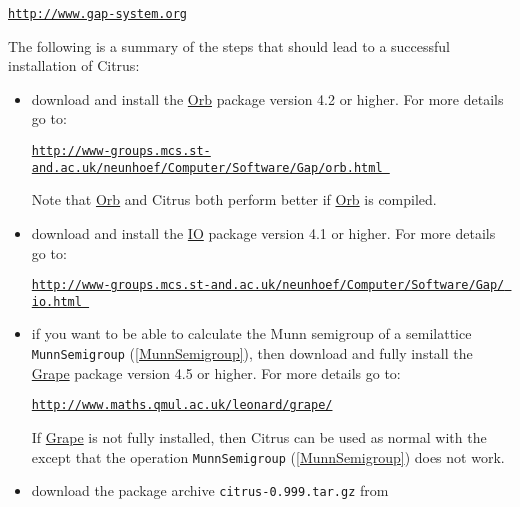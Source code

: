 \documentclass[a4paper,11pt]{report}
\begin{document}
{{\noindent\vspace{\baselineskip} \href{http://www.gap-system.org} {\texttt{http://www.gap-system.org}}

 \noindent The following is a summary of the steps that should lead to a successful
installation of \textsf{Citrus}: 
\begin{itemize}
\item  download and install the \href{ http://www-groups.mcs.st-and.ac.uk/~neunhoef/Computer/Software/Gap/orb.html } {Orb} package version 4.2 or higher. For more details go to: \vspace{\baselineskip}

\noindent \href{http://www-groups.mcs.st-and.ac.uk/~neunhoef/Computer/Software/Gap/orb.html } {\texttt{http://www-groups.mcs.st-and.ac.uk/\texttt{}neunhoef/Computer/Software/Gap/orb.html }}

 \noindent Note that \href{ http://www-groups.mcs.st-and.ac.uk/~neunhoef/Computer/Software/Gap/orb.html } {Orb} and \textsf{Citrus} both perform better if \href{ http://www-groups.mcs.st-and.ac.uk/~neunhoef/Computer/Software/Gap/orb.html } {Orb} is compiled. 
\item  download and install the \href{ http://www-groups.mcs.st-and.ac.uk/~neunhoef/Computer/Software/Gap/io.html } {IO} package version 4.1 or higher. For more details go to: \vspace{\baselineskip}

\noindent \href{http://www-groups.mcs.st-and.ac.uk/~neunhoef/Computer/Software/Gap/ io.html } {\texttt{http://www-groups.mcs.st-and.ac.uk/\texttt{}neunhoef/Computer/Software/Gap/ io.html }} 
\item  if you want to be able to calculate the Munn semigroup of a semilattice \texttt{MunnSemigroup} (\ref{MunnSemigroup}), then download and fully install the \href{http://www.maths.qmul.ac.uk/~leonard/grape/} {Grape} package version 4.5 or higher. For more details go to:\vspace{\baselineskip}

\noindent \href{http://www.maths.qmul.ac.uk/~leonard/grape/} {\texttt{http://www.maths.qmul.ac.uk/\texttt{}leonard/grape/}}

 If \href{http://www.maths.qmul.ac.uk/~leonard/grape/} {Grape} is not fully installed, then \textsf{Citrus} can be used as normal with the except that the operation \texttt{MunnSemigroup} (\ref{MunnSemigroup}) does not work. 
\item  download the package archive \texttt{citrus-0.999.tar.gz} from \vspace{\baselineskip}


\end{itemize}}}
\end{document}
